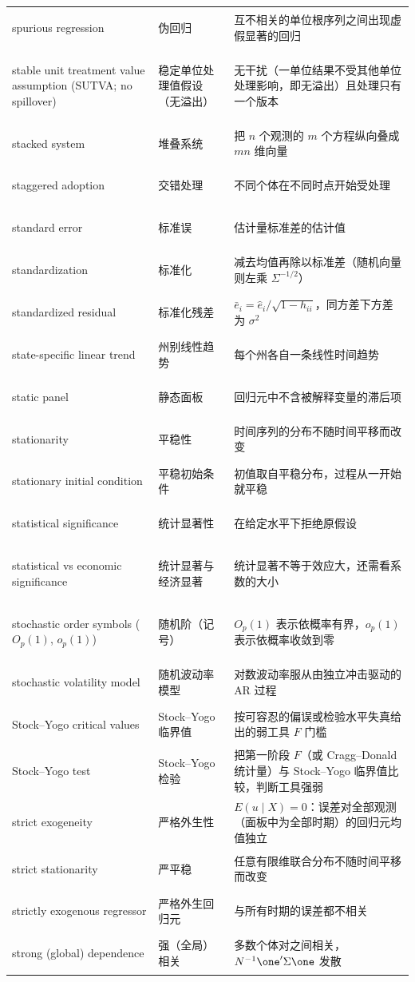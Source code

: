 \begin{longtable}{@{}>{\bfseries\boldmath\raggedright\arraybackslash}p{4.6cm}>{\raggedright\arraybackslash}p{3.2cm}>{\raggedright\arraybackslash}p{\dimexpr\textwidth-7.8cm-4\tabcolsep\relax}@{}}
spurious regression & 伪回归 & 互不相关的单位根序列之间出现虚假显著的回归 \\
stable unit treatment value assumption (SUTVA; no spillover) & 稳定单位处理值假设（无溢出） & 无干扰（一单位结果不受其他单位处理影响，即无溢出）且处理只有一个版本 \\
stacked system & 堆叠系统 & 把 $n$ 个观测的 $m$ 个方程纵向叠成 $mn$ 维向量 \\
staggered adoption & 交错处理 & 不同个体在不同时点开始受处理 \\
standard error & 标准误 & 估计量标准差的估计值 \\
standardization & 标准化 & 减去均值再除以标准差（随机向量则左乘 $\Sigma^{-1/2}$） \\
standardized residual & 标准化残差 & $\bar e_i=\hat e_i/\sqrt{1-h_{ii}}$，同方差下方差为 $\sigma^2$ \\
state-specific linear trend & 州别线性趋势 & 每个州各自一条线性时间趋势 \\
static panel & 静态面板 & 回归元中不含被解释变量的滞后项 \\
stationarity & 平稳性 & 时间序列的分布不随时间平移而改变 \\
stationary initial condition & 平稳初始条件 & 初值取自平稳分布，过程从一开始就平稳 \\
statistical significance & 统计显著性 & 在给定水平下拒绝原假设 \\
statistical vs economic significance & 统计显著与经济显著 & 统计显著不等于效应大，还需看系数的大小 \\
stochastic order symbols ($O_p(1)$, $o_p(1)$) & 随机阶（记号） & $O_p(1)$ 表示依概率有界，$o_p(1)$ 表示依概率收敛到零 \\
stochastic volatility model & 随机波动率模型 & 对数波动率服从由独立冲击驱动的 AR 过程 \\
Stock--Yogo critical values & Stock--Yogo 临界值 & 按可容忍的偏误或检验水平失真给出的弱工具 $F$ 门槛 \\
Stock--Yogo test & Stock--Yogo 检验 & 把第一阶段 $F$（或 Cragg--Donald 统计量）与 Stock--Yogo 临界值比较，判断工具强弱 \\
strict exogeneity & 严格外生性 & $E(u\mid X)=0$：误差对全部观测（面板中为全部时期）的回归元均值独立 \\
strict stationarity & 严平稳 & 任意有限维联合分布不随时间平移而改变 \\
strictly exogenous regressor & 严格外生回归元 & 与所有时期的误差都不相关 \\
strong (global) dependence & 强（全局）相关 & 多数个体对之间相关，$N^{-1}\one'\Sigma\one$ 发散 \\

\end{longtable}

